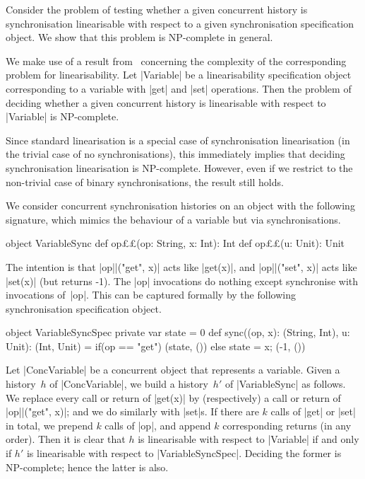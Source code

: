 Consider the problem of testing whether a given concurrent history is
synchronisation linearisable with respect to a given synchronisation
specification object.  We show that this problem is NP-complete in general.



We make use of a result from~\cite{???} concerning the complexity of the
corresponding problem for linearisability.  Let |Variable| be a
linearisability specification object corresponding to a variable with |get|
and |set| operations.  Then the problem of deciding whether a given concurrent
history is linearisable with respect to |Variable| is NP-complete.

Since standard linearisation is a special case of synchronisation
linearisation (in the trivial case of no synchronisations), this immediately
implies that deciding synchronisation linearisation is NP-complete.  However,
even if we restrict to the non-trivial case of binary synchronisations, the
result still holds.

We consider concurrent synchronisation histories on an object with the
following signature, which mimics the behaviour of a variable but via
synchronisations. 
%
\begin{scala}
object VariableSync{
  def op££(op: String, x: Int): Int
  def op££(u: Unit): Unit
} 
\end{scala}
%
The intention is that |op||("get", x)| acts like |get(x)|, and
|op||("set", x)| acts like |set(x)| (but returns -1).  The |op|
invocations do nothing except synchronise with invocations of~|op|.  This
can be captured formally by the following synchronisation specification
object.
%
\begin{scala}
object VariableSyncSpec{
  private var state = 0
  def sync((op, x): (String, Int), u: Unit): (Int, Unit) = 
    if(op == "get") (state, ()) else{ state = x; (-1, ()) }
}
\end{scala}


Let |ConcVariable| be a concurrent object that represents a variable.  Given a
history~$h$ of |ConcVariable|, we build a history~$h'$
of |VariableSync| as follows.  We replace every call or return of |get(x)| by
(respectively) a call or return of |op||("get", x)|; and we do similarly
with |set|s.  If there are $k$ calls of |get| or |set| in total, we prepend
$k$ calls of |op|, and append $k$ corresponding returns (in any order).
%
Then it is clear that $h$ is linearisable with respect to |Variable| if and
only if $h'$ is linearisable with respect to |VariableSyncSpec|.  Deciding the
former is NP-complete; hence the latter is also. 



